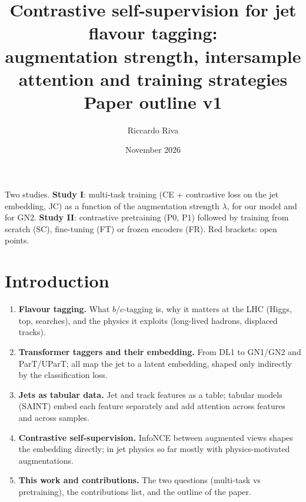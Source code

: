\documentclass[11pt,a4paper]{article}
\title{Contrastive self-supervision for jet flavour tagging:\\
augmentation strength, intersample attention and training strategies\\[4pt]
\large Paper outline v1}
\author{Riccardo Riva}
\date{November 2026}
\begin{document}
\maketitle
\tableofcontents
\newpage

\noindent Two studies. \textbf{Study I}: multi-task training (CE + contrastive loss on the jet
embedding, JC) as a function of the augmentation strength $\lambda$, for our model and for
GN2. \textbf{Study II}: contrastive pretraining (P0, P1) followed by training from scratch
(SC), fine-tuning (FT) or frozen encoders (FR). Red brackets: open points.

\section{Introduction}
\begin{enumerate}
  \item \textbf{Flavour tagging.} What $b$/$c$-tagging is, why it matters at the LHC (Higgs,
        top, searches), and the physics it exploits (long-lived hadrons, displaced tracks).
  \item \textbf{Transformer taggers and their embedding.} From DL1 to GN1/GN2 and ParT/UParT;
        all map the jet to a latent embedding, shaped only indirectly by the classification loss.
  \item \textbf{Jets as tabular data.} Jet and track features as a table; tabular models
        (SAINT) embed each feature separately and add attention across features and across samples.
  \item \textbf{Contrastive self-supervision.} InfoNCE between augmented views shapes the
        embedding directly; in jet physics so far mostly with physics-motivated augmentations.
  \item \textbf{This work and contributions.} The two questions (multi-task vs pretraining),
        the contributions list, and the outline of the paper.
\end{enumerate}

\end{document}
